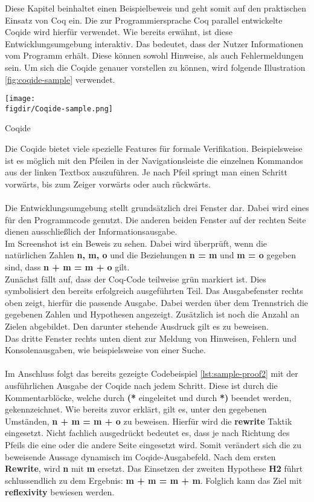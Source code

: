 Diese Kapitel beinhaltet einen Beispielbeweis und geht somit auf den praktischen Einsatz von Coq ein. Die zur Programmiersprache Coq parallel entwickelte Coqide wird hierfür verwendet. Wie bereits erwähnt, ist diese Entwicklungsumgebung interaktiv. Das bedeutet, dass der Nutzer Informationen vom Programm erhält. Diese können sowohl Hinweise, als auch Fehlermeldungen sein. Um sich die Coqide genauer vorstellen zu können, wird folgende Illustration \ref{fig:coqide-sample} verwendet.
\begin{minipage}{\textwidth}
	\centering
	\captionsetup{type=figure}
	\texttt{[image: \\figdir/Coqide-sample.png]}
	\caption{Coqide}
	\label{fig:coqide-sample}
\end{minipage}
Die Coqide bietet viele spezielle Features für formale Verifikation. Beispielsweise ist es möglich mit den Pfeilen in der Navigationsleiste die einzelnen Kommandos aus der linken Textbox auszuführen. Je nach Pfeil springt man einen Schritt vorwärts, bis zum Zeiger vorwärts oder auch rückwärts.\\
\\
Die Entwicklungsumgebung stellt grundsätzlich drei Fenster dar. Dabei wird eines für den Programmcode genutzt. Die anderen beiden Fenster auf der rechten Seite dienen ausschließlich der Informationsausgabe.\\
Im Screenshot ist ein Beweis zu sehen. Dabei wird überprüft, wenn die natürlichen Zahlen \textbf{n, m, o} und die Beziehungen \textbf{n = m} und \textbf{m = o} gegeben sind, dass \textbf{n + m = m + o} gilt.\\
Zunächst fällt auf, dass der Coq-Code teilweise grün markiert ist. Dies symbolisiert den bereits erfolgreich ausgeführten Teil. Das Ausgabefenster rechts oben zeigt, hierfür die passende Ausgabe. Dabei werden über dem Trennstrich die gegebenen Zahlen und Hypothesen angezeigt. Zusätzlich ist noch die Anzahl an Zielen abgebildet. Den darunter stehende Ausdruck gilt es zu beweisen.\\
Das dritte Fenster rechts unten dient zur Meldung von Hinweisen, Fehlern und Konsolenausgaben, wie beispielsweise von einer Suche.\\
\\
Im Anschluss folgt das bereits gezeigte Codebeispiel \ref{lst:sample-proof2} mit der ausführlichen Ausgabe der Coqide nach jedem Schritt.
Diese ist durch die Kommentarblöcke, welche durch \textbf{(*} eingeleitet und durch \textbf{*)} beendet werden, gekennzeichnet.
Wie bereits zuvor erklärt, gilt es, unter den gegebenen Umständen, \textbf{n + m = m + o} zu beweisen. Hierfür wird die \textbf{rewrite} Taktik eingesetzt. Nicht fachlich ausgedrückt bedeutet es, dass je nach Richtung des Pfeils die eine oder die andere Seite eingesetzt wird. Somit verändert sich die zu beweisende Aussage dynamisch im Coqide-Ausgabefeld. Nach dem ersten \textbf{Rewrite}, wird \textbf{n} mit \textbf{m} ersetzt. Das Einsetzen der zweiten Hypothese \textbf{H2} führt schlussendlich zu dem Ergebnis: \textbf{m + m = m + m}. Folglich kann das Ziel mit \textbf{reflexivity} bewiesen werden.
